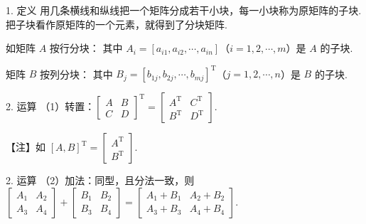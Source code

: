 \begin{fcard}{1. 定义}
用几条横线和纵线把一个矩阵分成若干小块，每一小块称为原矩阵的子块. 把子块看作原矩阵的一个元素，就得到了分块矩阵.

如矩阵 $A$ 按行分块：
其中 $A_i=[a_{i1},a_{i2},\cdots,a_{in}]$（$i=1,2,\cdots,m$）是 $A$ 的子块.

矩阵 $B$ 按列分块：
其中 $B_j=[b_{1j},b_{2j},\cdots,b_{mj}]^{\mathrm{T}}$（$j=1,2,\cdots,n$）是 $B$ 的子块.
\end{fcard}

\begin{fcard}{2. 运算}
（1）转置：$\begin{bmatrix}A & B\\ C & D\end{bmatrix}^{\mathrm{T}}=\begin{bmatrix}A^{\mathrm{T}} & C^{\mathrm{T}}\\ B^{\mathrm{T}} & D^{\mathrm{T}}\end{bmatrix}$.
\end{fcard}

\begin{fnote}
【注】如 $[A,B]^{\mathrm{T}}=\begin{bmatrix}A^{\mathrm{T}}\\ B^{\mathrm{T}}\end{bmatrix}$.
\end{fnote}

\begin{fcard}{2. 运算}
（2）加法：同型，且分法一致，则 $\begin{bmatrix}A_1 & A_2\\ A_3 & A_4\end{bmatrix}+\begin{bmatrix}B_1 & B_2\\ B_3 & B_4\end{bmatrix}=\begin{bmatrix}A_1+B_1 & A_2+B_2\\ A_3+B_3 & A_4+B_4\end{bmatrix}$.
\end{fcard}

